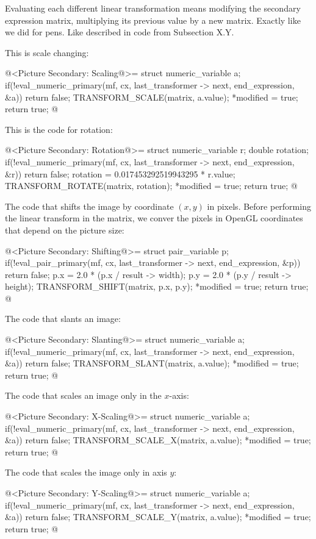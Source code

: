 {{{{{Evaluating each different linear transformation means modifying the
secondary expression matrix, multiplying its previous value by a new
matrix. Exactly like we did for pens. Like described in code from
Subsection X.Y.

This is scale changing:

\iniciocodigo
@<Picture Secondary: Scaling@>=
struct numeric_variable a;
if(!eval_numeric_primary(mf, cx, last_transformer -> next, end_expression, &a))
  return false;
TRANSFORM_SCALE(matrix, a.value);
*modified = true;
return true;
@
\fimcodigo

This is the code for rotation:

\iniciocodigo
@<Picture Secondary: Rotation@>=
struct numeric_variable r;
double rotation;
if(!eval_numeric_primary(mf, cx, last_transformer -> next, end_expression, &r))
  return false;
rotation = 0.017453292519943295 * r.value;
TRANSFORM_ROTATE(matrix, rotation);
*modified = true;
return true;
@
\fimcodigo

The code that shifts the image by coordinate $(x, y)$ in
pixels. Before performing the linear transform in the matrix, we
conver the pixels in OpenGL coordinates that depend on the picture
size:

\iniciocodigo
@<Picture Secondary: Shifting@>=
struct pair_variable p;
if(!eval_pair_primary(mf, cx, last_transformer -> next, end_expression, &p))
  return false;
p.x = 2.0 * (p.x / result -> width);
p.y = 2.0 * (p.y / result -> height);
TRANSFORM_SHIFT(matrix, p.x, p.y);
*modified = true;
return true;
@
\fimcodigo

The code that slants an image:

\iniciocodigo
@<Picture Secondary: Slanting@>=
struct numeric_variable a;
if(!eval_numeric_primary(mf, cx, last_transformer -> next, end_expression, &a))
  return false;
TRANSFORM_SLANT(matrix, a.value);
*modified = true;
return true;
@
\fimcodigo

The code that scales an image only in the $x$-axis:

\iniciocodigo
@<Picture Secondary: X-Scaling@>=
struct numeric_variable a;
if(!eval_numeric_primary(mf, cx, last_transformer -> next, end_expression, &a))
  return false;
TRANSFORM_SCALE_X(matrix, a.value);
*modified = true;
return true;
@
\fimcodigo

The code that scales the image only in axis $y$:

\iniciocodigo
@<Picture Secondary: Y-Scaling@>=
struct numeric_variable a;
if(!eval_numeric_primary(mf, cx, last_transformer -> next, end_expression, &a))
  return false;
TRANSFORM_SCALE_Y(matrix, a.value);
*modified = true;
return true;
@
\fimcodigo

}}}}}
